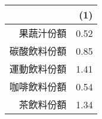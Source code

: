 \begin{tabular}{rr}
  \hline
 & (1) \\ 
  \hline
果蔬汁份額 & 0.52 \\ 
  碳酸飲料份額 & 0.85 \\ 
  運動飲料份額 & 1.41 \\ 
  咖啡飲料份額 & 0.54 \\ 
  茶飲料份額 & 1.34 \\ 
   \hline
\end{tabular}
